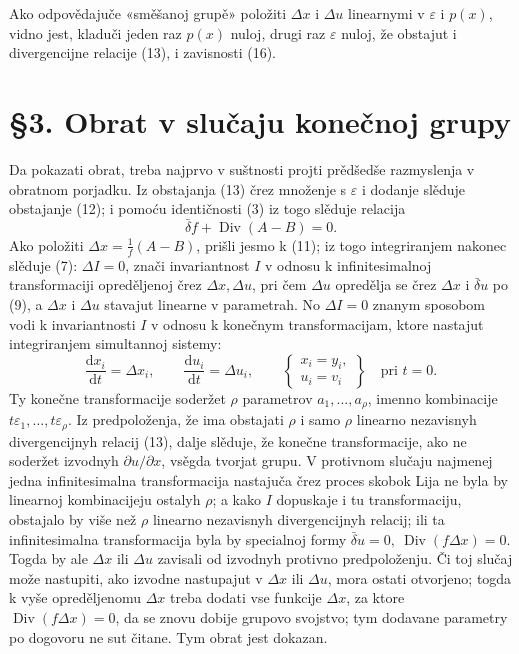 \documentclass[11pt]{article}
\providecommand{\eps}{\varepsilon}
\providecommand{\D}{\Delta}
\providecommand{\p}{\partial}
\providecommand{\dd}{\mathrm d}
\DeclareMathOperator{\Div}{Div}
\providecommand{\bd}{\bar{\delta}}
\begin{document}
Ako odpovědajuče «směšanoj grupě» položiti \(\D x\) i \(\D u\) linearnymi v \(\eps\) i \(p(x)\), vidno jest, kladuči jeden raz \(p(x)\) nuloj, drugi raz \(\eps\) nuloj, že obstajut i divergencijne relacije (13), i zavisnosti (16).

\section*{\S{}3. Obrat v slučaju konečnoj grupy}

Da pokazati obrat, treba najprvo v suštnosti projti prědšedše razmyslenja v obratnom porjadku. Iz obstajanja (13) črez množenje s \(\eps\) i dodanje slěduje obstajanje (12); i pomoću identičnosti (3) iz togo slěduje relacija
\[
\bd f+\Div(A-B)=0.
\]
Ako položiti \(\D x=\frac{1}{f}(A-B)\), prišli jesmo k (11); iz togo integriranjem nakonec slěduje (7): \(\D I=0\), znači invariantnost \(I\) v odnosu k infinitesimalnoj transformaciji opreděljenoj črez \(\D x,\D u\), pri čem \(\D u\) opredělja se črez \(\D x\) i \(\bd u\) po (9), a \(\D x\) i \(\D u\) stavajut linearne v parametrah. No \(\D I=0\) znanym sposobom vodi k invariantnosti \(I\) v odnosu k konečnym transformacijam, ktore nastajut integriranjem simultannoj sistemy:
\begin{equation}
\frac{\dd x_i}{\dd t}=\D x_i,\qquad
\frac{\dd u_i}{\dd t}=\D u_i,\qquad
\left\{\begin{array}{l}
x_i=y_i,\\
u_i=v_i
\end{array}\right\}
\quad\text{pri }t=0.
\tag{17}
\end{equation}
Ty konečne transformacije soderžet \(\rho\) parametrov \(a_1,\ldots,a_\rho\), imenno kombinacije \(t\eps_1,\ldots,t\eps_\rho\). Iz predpoloženja, že ima obstajati \(\rho\) i samo \(\rho\) linearno nezavisnyh divergencijnyh relacij (13), dalje slěduje, že konečne transformacije, ako ne soderžet izvodnyh \(\p u/\p x\), vsěgda tvorjat grupu. V protivnom slučaju najmenej jedna infinitesimalna transformacija nastajuča črez proces skobok Lija ne byla by linearnoj kombinacijeju ostalyh \(\rho\); a kako \(I\) dopuskaje i tu transformaciju, obstajalo by više než \(\rho\) linearno nezavisnyh divergencijnyh relacij; ili ta infinitesimalna transformacija byla by specialnoj formy \(\bd u=0,\ \Div(f\D x)=0\). Togda by ale \(\D x\) ili \(\D u\) zavisali od izvodnyh protivno predpoloženju. Či toj slučaj može nastupiti, ako izvodne nastupajut v \(\D x\) ili \(\D u\), mora ostati otvorjeno; togda k vyše opreděljenomu \(\D x\) treba dodati vse funkcije \(\D x\), za ktore \(\Div(f\D x)=0\), da se znovu dobije grupovo svojstvo; tym dodavane parametry po dogovoru ne sut čitane. Tym obrat jest dokazan.
\end{document}

